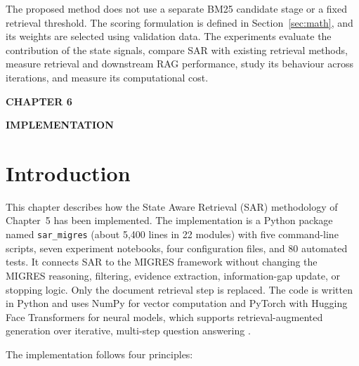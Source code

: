 \documentclass[12pt,a4paper]{report}
\newcommand{\chaptertitle}[2]{
    \begin{center}
        {\fontsize{18}{21}\selectfont\bfseries CHAPTER #1\par}
        \vspace{0.10in}
        {\fontsize{18}{21}\selectfont\bfseries #2\par}
    \end{center}
    \vspace{0.12in}
}
\begin{document}
The proposed method does not use a separate BM25 candidate stage or a
fixed retrieval threshold. The scoring formulation is defined in
Section~\ref{sec:math}, and its weights are selected using validation
data. The experiments evaluate the
contribution of the state signals, compare SAR with existing retrieval
methods, measure retrieval and downstream RAG performance, study its
behaviour across iterations, and measure its computational cost.
\label{ch:5:end}

\clearpage


\setcounter{table}{0}
\renewcommand{\thetable}{6.\arabic{table}}
\setcounter{figure}{0}
\renewcommand{\thefigure}{6.\arabic{figure}}
\setcounter{chapter}{6}
\setcounter{section}{0}
\setcounter{subsection}{0}

\chaptertitle{6}{IMPLEMENTATION}
\label{ch:6}
\justifying

\section{Introduction}

This chapter describes how the State Aware Retrieval (SAR) methodology of Chapter~5 has been implemented. The implementation is a Python package named \texttt{sar\_migres} (about 5,400 lines in 22 modules) with five command-line scripts, seven experiment notebooks, four configuration files, and 80 automated tests. It connects SAR to the MIGRES framework \cite{wang2025migres} without changing the MIGRES reasoning, filtering, evidence extraction, information-gap update, or stopping logic. Only the document retrieval step is replaced. The code is written in Python and uses NumPy \cite{harris2020numpy} for vector computation and PyTorch \cite{paszke2019pytorch} with Hugging Face Transformers \cite{wolf2020transformers} for neural models, which supports retrieval-augmented generation \cite{lewis2020rag} over iterative, multi-step question answering \cite{yadav2020iterative}.

The implementation follows four principles:
\end{document}
